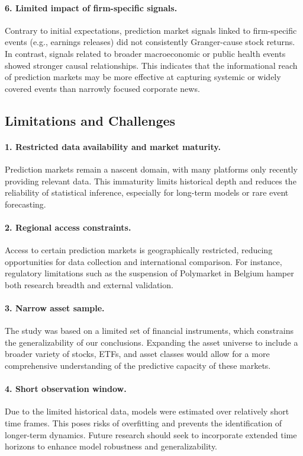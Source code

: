 \documentclass[12pt]{report}
\begin{document}
\paragraph{6. Limited impact of firm-specific signals.}
Contrary to initial expectations, prediction market signals linked to firm-specific events (e.g., earnings releases) did not consistently Granger-cause stock returns. In contrast, signals related to broader macroeconomic or public health events showed stronger causal relationships. This indicates that the informational reach of prediction markets may be more effective at capturing systemic or widely covered events than narrowly focused corporate news.

\subsection{Limitations and Challenges}

\paragraph{1. Restricted data availability and market maturity.}
Prediction markets remain a nascent domain, with many platforms only recently providing relevant data. This immaturity limits historical depth and reduces the reliability of statistical inference, especially for long-term models or rare event forecasting.

\paragraph{2. Regional access constraints.}
Access to certain prediction markets is geographically restricted, reducing opportunities for data collection and international comparison. For instance, regulatory limitations such as the suspension of Polymarket in Belgium hamper both research breadth and external validation.

\paragraph{3. Narrow asset sample.}
The study was based on a limited set of financial instruments, which constrains the generalizability of our conclusions. Expanding the asset universe to include a broader variety of stocks, ETFs, and asset classes would allow for a more comprehensive understanding of the predictive capacity of these markets.

\paragraph{4. Short observation window.}
Due to the limited historical data, models were estimated over relatively short time frames. This poses risks of overfitting and prevents the identification of longer-term dynamics. Future research should seek to incorporate extended time horizons to enhance model robustness and generalizability.
\end{document}
